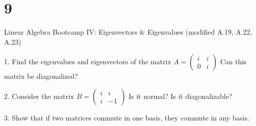 \documentclass{article}
\begin{document}
\newpage
\section*{9}
\begin{ques}
Linear Algebra Bootcamp IV: Eigenvectors \& Eigenvalues (modified A.19, A.22, A.23)

1. Find the eigenvalues and eigenvectors of the matrix  
$A = \begin{pmatrix} i & i \\ 0 & i \end{pmatrix}$  
Can this matrix be diagonalized?

2. Consider the matrix  
$B = \begin{pmatrix} i & i \\ i & -1 \end{pmatrix}$  
Is it normal? Is it diagonalizable?

3. Show that if two matrices commute in one basis, they commute in any basis.
\end{ques}
\end{document}
